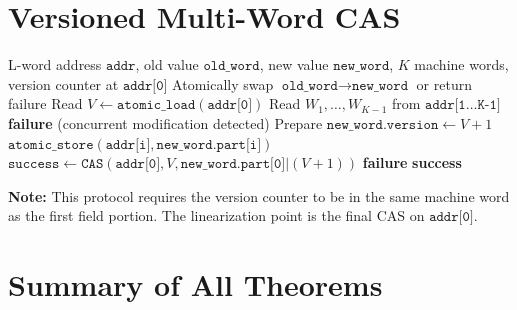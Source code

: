 \documentclass[11pt,a4paper]{article}
\theoremstyle{definition}
\theoremstyle{plain}
\theoremstyle{remark}
\begin{document}
\section{Versioned Multi-Word CAS}
\label{app:mwcas}

\begin{algorithm}[H]
\caption{Versioned Multi-Word CAS for Wide L-Words}
\label{alg:mwcas}
\begin{algorithmic}[1]
\REQUIRE L-word address $\texttt{addr}$, old value $\texttt{old\_word}$, new value $\texttt{new\_word}$, $K$ machine words, version counter at $\texttt{addr[0]}$
\ENSURE Atomically swap $\texttt{old\_word}\to\texttt{new\_word}$ or return failure
\STATE Read $V \leftarrow \texttt{atomic\_load}(\texttt{addr[0]})$
\STATE Read $W_1,\ldots,W_{K-1}$ from $\texttt{addr[1\ldots K-1]}$
  \RETURN \textbf{failure} (concurrent modification detected)
\ENDIF
\STATE Prepare $\texttt{new\_word.version} \leftarrow V+1$
  \STATE $\texttt{atomic\_store}(\texttt{addr[i]}, \texttt{new\_word.part[i]})$
\ENDFOR
\STATE $\texttt{success} \leftarrow \texttt{CAS}(\texttt{addr[0]}, V, \texttt{new\_word.part[0]} | (V+1))$
 \RETURN \textbf{failure} \ENDIF
\RETURN \textbf{success}
\end{algorithmic}
\end{algorithm}

\textbf{Note:} This protocol requires the version counter to be in the same machine word as the first field portion.  The linearization point is the final CAS on $\texttt{addr[0]}$.

\section{Summary of All Theorems}
\label{app:summary}
\end{document}
